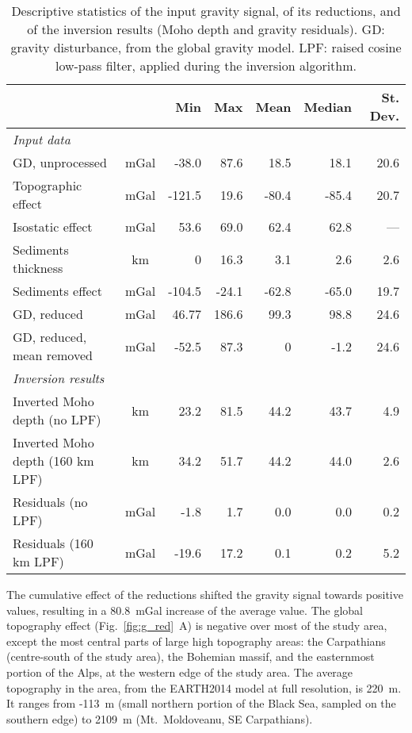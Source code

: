 {\begin{table}
    \caption{Descriptive statistics of the input gravity signal, of its reductions, and of the inversion results (Moho depth and gravity residuals). GD: gravity disturbance, from the global gravity model. LPF: raised cosine low-pass filter, applied during the inversion algorithm.}
    \begin{adjustbox}{center}
    \begingroup\setlength{\fboxsep}{0pt}
    \colorbox{tablebackground}{%
	\begin{tabular}{lcrrrrr}
		\hline
		 & & \textbf{Min} & \textbf{Max} & \textbf{Mean} & \textbf{Median} & \textbf{St. Dev.} \\
		\hline
		\textit{Input data} \\
		\quad GD, unprocessed & mGal & -38.0 & 87.6 & 18.5 & 18.1 & 20.6 \\
		\quad Topographic effect & mGal & -121.5 & 19.6 & -80.4 & -85.4 & 20.7 \\
		\quad Isostatic effect & mGal & 53.6 & 69.0 & 62.4 & 62.8 & --- \\
		\quad Sediments thickness & km & 0 & 16.3 & 3.1 & 2.6 & 2.6 \\
		\quad Sediments effect & mGal & -104.5 & -24.1 & -62.8 & -65.0 & 19.7 \\
		\quad GD, reduced & mGal & 46.77 & 186.6 & 99.3 & 98.8 & 24.6 \\
		\quad GD, reduced, mean removed & mGal & -52.5 & 87.3 & 0 & -1.2 & 24.6 \\
		\textit{Inversion results} \\
		\quad Inverted Moho depth (no LPF) & km & 23.2 & 81.5 & 44.2 & 43.7 & 4.9 \\
		\quad Inverted Moho depth (160 km LPF) & km & 34.2 & 51.7 & 44.2 & 44.0 & 2.6 \\
		\quad Residuals (no LPF) & mGal & -1.8 & 1.7 & 0.0 & 0.0 & 0.2 \\
		\quad Residuals (160 km LPF) & mGal & -19.6 & 17.2 & 0.1 & 0.2 & 5.2 \\
		\hline
    \end{tabular}
    }\endgroup
    \end{adjustbox}
	\label{tab:GravDescrStats}
\end{table}

The cumulative effect of the reductions shifted the gravity signal towards positive values, resulting in a 80.8~mGal increase of the average value.
The global topography effect (Fig.~\ref{fig:g_red}~A) is negative over most of the study area, except the most central parts of large high topography areas: the Carpathians (centre-south of the study area), the Bohemian massif, and the easternmost portion of the Alps, at the western edge of the study area.
The average topography in the area, from the {EARTH2014} model at full resolution, is 220~m.
It ranges from -113~m (small northern portion of the Black Sea, sampled on the southern edge) to 2109~m (Mt.~Moldoveanu, SE Carpathians).

}
